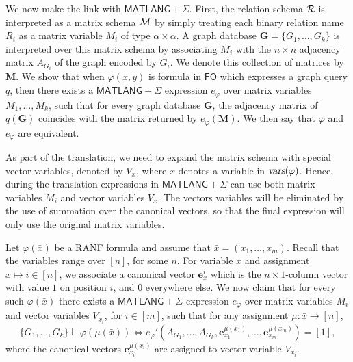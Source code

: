 We now make the link with $\textsf{MATLANG}+\Sigma$. First, the relation schema ${\cal R}$ is interpreted as a matrix schema ${\cal M}$ by simply treating each binary relation name $R_i$ as a matrix variable $M_i$ of type $\alpha\times\alpha$. A graph database $\mathbf{G}=\{G_1,\ldots,G_k\}$ is interpreted over this matrix schema by associating $M_i$ with the $n\times n$ adjacency matrix $A_{G_i}$ of the graph encoded by $G_i$. We denote this collection of matrices by $\mathbf{M}$. We show that
when $\varphi(x,y)$ is formula in $\textsf{FO}$ which expresses a graph query $q$, then there exists a $\textsf{MATLANG}+\Sigma$ expression $e_\varphi$ over matrix variables $M_1,\ldots,M_k$, such that for every graph database $\mathbf{G}$, the adjacency matrix of $q(\mathbf{G})$ coincides with the matrix returned by $e_\varphi(\mathbf{M})$. We then say that $\varphi$ and $e_\varphi$ are equivalent.

As part of the translation, we need to expand the matrix schema with special vector variables, denoted by $V_x$, where $x$ denotes a variable in $\textsl{vars}(\varphi)$. Hence, during the translation expressions in $\textsf{MATLANG}+\Sigma$ can use both matrix variables $M_i$ and vector variables $V_x$. The vectors variables will be eliminated by the use of summation over the canonical vectors, so that the final expression will only use the original matrix variables.

Let $\varphi(\bar x)$ be a RANF formula and assume that $\bar x=(x_1,\ldots,x_m)$. Recall that the variables range over $[n]$, for some $n$. For variable $x$ and assignment $x\mapsto i\in[n]$, we associate a canonical vector $\mathbf{e}_x^i$ which is the $n\times 1$-column vector with value $1$ on position $i$, and $0$ everywhere else. We now claim that for every such $\varphi(\bar x)$ there exists a $\textsf{MATLANG}+\Sigma$ expression $e_\varphi$ over matrix variables $M_i$ and vector variables $V_{x_i}$, for $i\in[m]$, such that for any assignment $\mu:\bar x \to [n]$, 
\begin{equation}
\{G_1,\ldots,G_k\}\models \varphi(\mu(\bar x)) \Leftrightarrow e_\varphi'(A_{G_1},\ldots,A_{G_k},\mathbf{e}_{x_1}^{\mu(x_1)},\ldots,\mathbf{e}_{x_m}^{\mu(x_m)})=[1], \tag{$\dagger$}
\end{equation}
where the canonical vectors $\mathbf{e}_{x_i}^{\mu(x_i)}$ are assigned to vector variable $V_{x_i}$.

